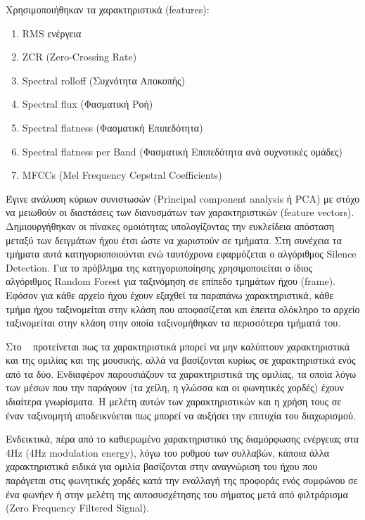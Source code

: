 Χρησιμοποιήθηκαν τα χαρακτηριστικά (features):
\begin{enumerate}[noitemsep]
\item RMS ενέργεια
\item ZCR (Zero-Crossing Rate)
\item Spectral rolloff (Συχνότητα Αποκοπής)
\item Spectral flux (Φασματική Ροή)
\item Spectral flatness (Φασματική Επιπεδότητα)
\item Spectral flatness per Band (Φασματική Επιπεδότητα ανά συχνοτικές ομάδες)
\item MFCCs (Mel Frequency Cepstral Coefficients)
\end{enumerate}

Έγινε ανάλυση κύριων συνιστωσών (Principal component analysis ή PCA) με στόχο να
μειωθούν οι διαστάσεις των διανυσμάτων των χαρακτηριστικών (feature vectors).
Δημιουργήθηκαν οι πίνακες ομοιότητας υπολογίζοντας την ευκλείδεια απόσταση
μεταξύ των δειγμάτων ήχου έτσι ώστε να χωριστούν σε τμήματα. Στη συνέχεια τα
τμήματα αυτά κατηγοριοποιούνται ενώ ταυτόχρονα εφαρμόζεται ο αλγόριθμος Silence
Detection. Για το πρόβλημα της
κατηγοριοποίησης χρησιμοποιείται ο ίδιος αλγόριθμος Random Forest για
ταξινόμηση σε επίπεδο τμημάτων ήχου (frame). Εφόσον για κάθε αρχείο ήχου έχουν
εξαχθεί τα παραπάνω χαρακτηριστικά, κάθε τμήμα ήχου ταξινομείται στην κλάση που
αποφασίζεται και έπειτα ολόκληρο το αρχείο ταξινομείται στην κλάση στην οποία
ταξινομήθηκαν τα περισσότερα τμήματά του.

\vspace{1em}
Στο ~\cite{speech} προτείνεται πως τα χαρακτηριστικά μπορεί να μην καλύπτουν
χαρακτηριστικά και της ομιλίας και της μουσικής, αλλά να βασίζονται κυρίως σε
χαρακτηριστικά ενός από τα δύο. Ενδιαφέρον παρουσιάζουν τα χαρακτηριστικά της
ομιλίας, τα οποία λόγω των μέσων που την παράγουν (τα χείλη, η γλώσσα και οι
φωνητικές χορδές) έχουν ιδιαίτερα γνωρίσματα. Η μελέτη αυτών των χαρακτηριστικών
και η χρήση τους σε έναν ταξινομητή αποδεικνύεται πως μπορεί να
αυξήσει την επιτυχία του διαχωρισμού.

Ενδεικτικά, πέρα από το καθιερωμένο χαρακτηριστικό της διαμόρφωσης ενέργειας στα 4Hz (4Hz modulation energy), λόγω του
ρυθμού των συλλαβών, κάποια άλλα χαρακτηριστικά ειδικά για ομιλία βασίζονται στην
αναγνώριση του ήχου που παράγεται στις φωνητικές χορδές κατά την εναλλαγή της
προφοράς ενός συμφώνου σε ένα φωνήεν ή στην μελέτη της αυτοσυσχέτησης του
σήματος μετά από φιλτράρισμα (Zero Frequency Filtered Signal).

